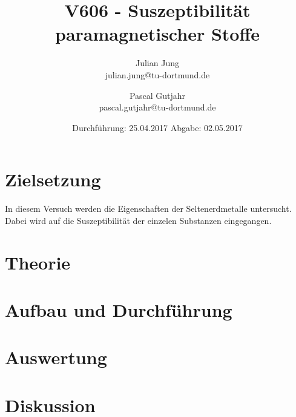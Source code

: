 

\title{V606 - Suszeptibilität paramagnetischer Stoffe}
\author{Julian Jung \\ julian.jung@tu-dortmund.de
  \and Pascal Gutjahr \\ pascal.gutjahr@tu-dortmund.de}
  \date{Durchführung: 25.04.2017
  \hspace{3em}
  Abgabe: 02.05.2017}
  
\maketitle
\newpage
\tableofcontents
\newpage
\section{Zielsetzung}
In diesem Versuch werden die Eigenschaften der Seltenerdmetalle untersucht.
Dabei wird auf die Suszeptibilität der einzelen Substanzen eingegangen.
\section{Theorie}

\section{Aufbau und Durchführung}
 
\section{Auswertung}
\section{Diskussion}
% 
\printbibliography

